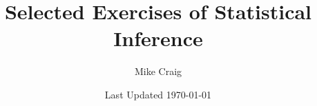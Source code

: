 \documentclass{article}
\theoremstyle{remark}
\begin{document}
\title{Selected Exercises of Statistical Inference}
\author{Mike Craig}
\date{Last Updated \today}

\maketitle


\end{document}
